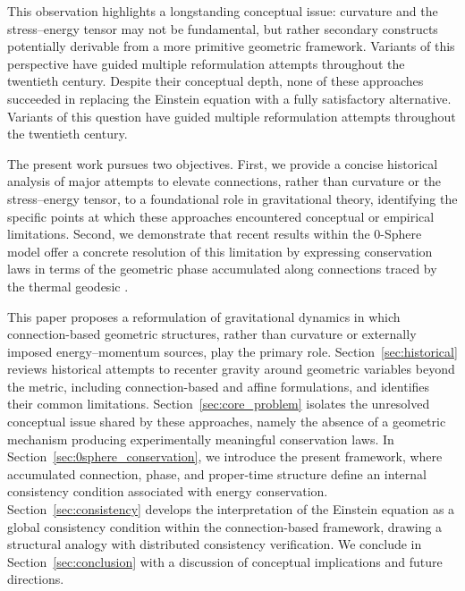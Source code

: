 \documentclass[%
 reprint,
 amsmath,amssymb,
 aps,
 prb,
]{revtex4-2}
\numberwithin{equation}{section}
\begin{document}
This observation highlights a longstanding conceptual issue: curvature and the stress--energy tensor may not be fundamental, but rather secondary constructs potentially derivable from a more primitive geometric framework. Variants of this perspective have guided multiple reformulation attempts throughout the twentieth century. Despite their conceptual depth, none of these approaches succeeded in replacing the Einstein equation with a fully satisfactory alternative. Variants of this question have guided multiple reformulation attempts throughout the twentieth century.

The present work pursues two objectives. First, we provide a concise historical analysis of major attempts to elevate connections, rather than curvature or the stress--energy tensor, to a foundational role in gravitational theory, identifying the specific points at which these approaches encountered conceptual or empirical limitations. Second, we demonstrate that recent results within the 0-Sphere model offer a concrete resolution of this limitation by expressing conservation laws in terms of the geometric phase accumulated along connections traced by the thermal geodesic \cite{hanamura17765017}.

This paper proposes a reformulation of gravitational dynamics in which connection-based geometric structures, rather than curvature or externally imposed energy--momentum sources, play the primary role. 
Section~\ref{sec:historical} reviews historical attempts to recenter gravity around geometric variables beyond the metric, including connection-based and affine formulations, and identifies their common limitations. 
Section~\ref{sec:core_problem} isolates the unresolved conceptual issue shared by these approaches, namely the absence of a geometric mechanism producing experimentally meaningful conservation laws. 
In Section~\ref{sec:0sphere_conservation}, we introduce the present framework, where accumulated connection, phase, and proper-time structure define an internal consistency condition associated with energy conservation.  
Section~\ref{sec:consistency} develops the interpretation of the Einstein equation as a global consistency condition within the connection-based framework, drawing a structural analogy with distributed consistency verification. We conclude in Section~\ref{sec:conclusion} with a discussion of conceptual implications and future directions.


\clearpage
\end{document}
